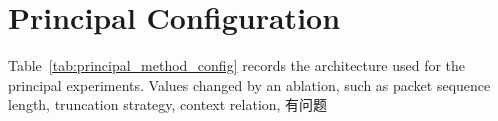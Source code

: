 \documentclass[11pt,fleqn]{report}
\begin{document}

\section{Principal Configuration}
\label{subsec:principal_configuration}

Table~\ref{tab:principal_method_config} records the architecture used for the
principal experiments. Values changed by an ablation, such as packet sequence
length, truncation strategy, context relation, 有问题
\end{document}
